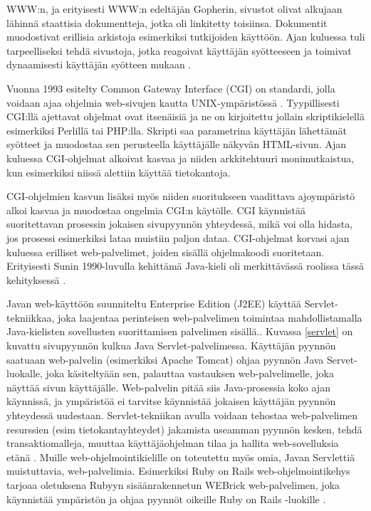 WWW:n, ja erityisesti WWW:n edeltäjän Gopherin, sivustot olivat alkujaan lähinnä staattisia dokumentteja, jotka oli linkitetty toisiinsa. Dokumentit muodostivat erillisia arkistoja esimerkiksi tutkijoiden käyttöön. Ajan kuluessa tuli tarpeelliseksi tehdä sivustoja, jotka reagoivat käyttäjän syötteeseen ja toimivat dynaamisesti käyttäjän syötteen mukaan \cite{dynamic}.

Vuonna 1993 esitelty Common Gateway Interface (CGI) on standardi, jolla voidaan ajaa ohjelmia web-sivujen kautta UNIX-ympäristössä \cite{rfc3875}. Tyypillisesti CGI:llä ajettavat ohjelmat ovat itsenäisiä ja ne on kirjoitettu jollain skriptikielellä esimerkiksi Perlillä tai PHP:lla. Skripti saa parametrina käyttäjän lähettämät syötteet ja muodostaa sen perusteella käyttäjälle näkyvän HTML-sivun. Ajan kuluessa CGI-ohjelmat alkoivat kasvaa ja niiden arkkitehtuuri monimutkaistua, kun esimerkiksi niissä alettiin käyttää tietokantoja.

CGI-ohjelmien kasvun lisäksi myös niiden suoritukseen vaadittava ajoympäristö alkoi kasvaa ja muodostaa ongelmia CGI:n käytölle. CGI käynnistää suoritettavan prosessin jokaisen sivupyynnön yhteydessä, mikä voi olla hidasta, jos prosessi esimerkiksi lataa muistiin paljon dataa. CGI-ohjelmat korvasi ajan kuluessa erilliset web-palvelimet, joiden sisällä ohjelmakoodi suoritetaan. Erityisesti Sunin 1990-luvulla kehittämä Java-kieli oli merkittävässä roolissa tässä kehityksessä \cite{uml}.

Javan web-käyttöön suunniteltu Enterprise Edition (J2EE) käyttää Serv\-let-tek\-niik\-kaa, joka laajentaa perinteisen web-palvelimen toimintaa mahdollistamalla Java-kielisten sovellusten suorittamisen palvelimen sisällä.. Kuvassa \ref{servlet} on kuvattu sivupyynnön kulkua Java Servlet-palvelimessa. Käyttäjän pyynnön saatuaan web-palvelin (esimerkiksi Apache Tomcat) ohjaa pyynnön Java Servet-luokalle, joka käsiteltyään sen, palauttaa vastauksen web-palvelimelle, joka näyttää sivun käyttäjälle. Web-palvelin pitää siis Java-prosessia koko ajan käynnissä, ja ympäristöä ei tarvitse käynnistää jokaisen käyttäjän pyynnön yhteydessä uudestaan. Servlet-tekniikan avulla voidaan tehostaa web-palvelimen resurssien (esim tietokantayhteydet) jakamista useamman pyynnön kesken, tehdä transaktiomalleja, muuttaa käyttäjäohjelman tilaa ja hallita web-sovelluksia etänä \cite{uml}. Muille web-ohjelmointikielille on toteutettu myös omia, Javan Servlettiä muistuttavia, web-palvelimia. Esimerkiksi Ruby on Rails web-ohjelmointikehys tarjoaa oletuksena Rubyyn sisäänrakennetun WEBrick web-palvelimen, joka käynnistää ympäristön ja ohjaa pyynnöt oikeille Ruby on Rails -luokille \cite{ruby2011agile}.


